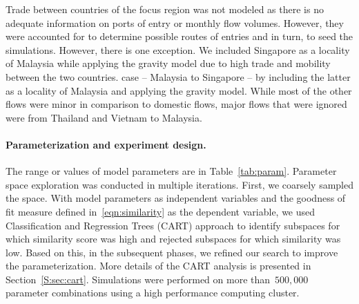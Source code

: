\documentclass[11pt]{article}
\theoremstyle{definition}
\begin{document}
Trade between countries of the focus region was not modeled as there is no
adequate information on ports of entry or monthly flow volumes. However,
they were accounted for to determine possible routes of entries and in
turn, to seed the simulations. However, there is one exception. We included
Singapore as a locality of Malaysia while applying the gravity model due to
high trade and mobility between the two countries.  case -- Malaysia to
Singapore -- by including the latter as a locality of Malaysia and applying
the gravity model. While most of the other flows were minor in comparison
to domestic flows, major flows that were ignored were from Thailand and
Vietnam to Malaysia.

\paragraph{Parameterization and experiment design.}
The range or values of model parameters are
in Table~\ref{tab:param}. Parameter space exploration was conducted in multiple iterations.  First,
we coarsely sampled the space. With model parameters as independent
variables and the goodness of fit measure defined in~\eqref{eqn:similarity}
as the dependent variable, we used Classification and Regression Trees
(CART) approach to identify subspaces for which similarity score was high and
rejected subspaces for which similarity was low. Based on this, in the
subsequent phases, we refined our search to improve the parameterization.
More details of the CART analysis is presented in Section~\ref{S:sec:cart}.
Simulations were performed on more than~$500,000$ parameter combinations
using a high performance computing cluster. 

\end{document}
